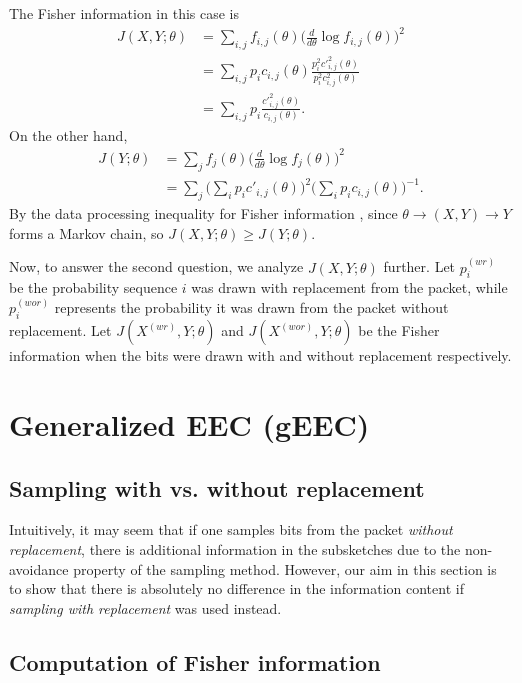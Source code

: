 \documentclass[12pt]{article}
\numberwithin{equation}{section}
\numberwithin{table}{section}
\numberwithin{figure}{section}
\begin{document}
The Fisher information in this case is
\begin{align}
\nonumber
J(X,Y;\theta) &= \sum_{i,j} f_{i,j}(\theta) \Big(\frac{d}{d\theta}\log f_{i,j}(\theta)\Big)^2\\
\nonumber
&= \sum_{i,j} p_i c_{i,j}(\theta) \frac{p^2_i c'^2_{i,j}(\theta)}{p^2_i c^2_{i,j}(\theta)}\\
\label{eq:FI_joint}
& = \sum_{i,j}  p_i\frac{c'^2_{i,j}(\theta)}{c_{i,j}(\theta)}.
\end{align}
On the other hand,
\begin{align}
\nonumber
J(Y;\theta) &= \sum_{j}  f_{j}(\theta) \Big(\frac{d}{d\theta}\log f_{j}(\theta)\Big)^2\\
\label{eq:FI_received}
&= \sum_{j} \Big(\sum_i p_i c'_{i,j}(\theta) \Big)^2 \Big(\sum_i p_i c_{i,j}(\theta) \Big)^{-1} .
\end{align}
By the data processing inequality for Fisher information \cite{Zamir98DPI}, since $\theta \to (X,Y) \to Y$ forms a Markov chain, so
$J(X,Y;\theta) \ge J(Y;\theta)$. 

Now, to answer the second question, we analyze $J(X,Y;\theta)$ further. Let $p^{(wr)}_i$ be the probability sequence $i$ was drawn
with replacement from the packet, while $p^{(wor)}_i$ represents the probability it was drawn from the packet without replacement. Let 
$J(X^{(wr)},Y;\theta)$ and $J(X^{(wor)},Y;\theta)$ be the Fisher information when the bits were drawn with and without replacement 
respectively.


\section{Generalized EEC (gEEC)}

\subsection{Sampling with vs. without replacement}

Intuitively, it may seem that if one samples bits from the packet \textit{without replacement}, there is additional information in the subsketches 
due to the non-avoidance property of the sampling method. However, our aim in this section is to show that there is absolutely no difference
in the information content if \textit{sampling with replacement} was used instead.


\subsection{Computation of Fisher information}
\end{document}
